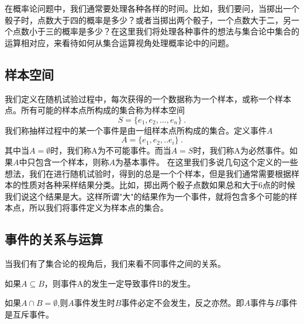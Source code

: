 在概率论问题中，我们通常要处理各种各样的时间。比如，我们要问，当掷出一个骰子时，点数大于四的概率是多少？或者当掷出两个骰子，一个点数大于二，另一个点数小于三的概率是多少？在这里我们将处理各种事件的想法与集合论中集合的运算相对应，来看待如何从集合运算视角处理概率论中的问题。
\subsection{样本空间}
我们定义在随机试验过程中，每次获得的一个数据称为一个样本，或称一个样本点。所有可能的样本点所构成的集合称为样本空间
\begin{equation}
S = \{e_1,e_2,...,e_n\}~.
\end{equation}
我们称抽样过程中的某一个事件是由一组样本点所构成的集合。定义事件$A$
\begin{equation}
A = \{e_1,e_2,..e_i\}~.
\end{equation}
其中当$A= \emptyset $时，我们称A为不可能事件。而当$A=S$时，我们称A为必然事件。如果$A$中只包含一个样本，则称$A$为基本事件。
在这里我们多说几句这个定义的一些想法，我们在进行随机试验时，得到的总是一个个样本，但是我们通常需要根据样本的性质对各种采样结果分类。比如，掷出两个骰子点数如果总和大于6点的时候我们说这个结果是大。这样所谓"大"的结果作为一个事件，就将包含多个可能的样本点，所以我们将事件定义为样本点的集合。
\subsection{事件的关系与运算}
当我们有了集合论的视角后，我们来看不同事件之间的关系。
\item 如果$A\subseteq B$，则事件A的发生一定导致事件B的发生。
\item 如果$A \cap B = \emptyset$,则$A$事件发生时$B$事件必定不会发生，反之亦然。即$A$事件与$B$事件是互斥事件。


